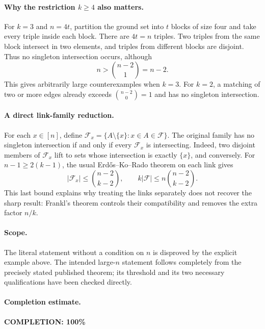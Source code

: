 \paragraph{Why the restriction \(k\geq4\) also matters.}
For \(k=3\) and \(n=4t\), partition the ground set into \(t\)
blocks of size four and take every triple inside each block.
There are \(4t=n\) triples. Two triples from the same block
intersect in two elements, and triples from different blocks
are disjoint. Thus no singleton intersection occurs, although
\[
 n>\binom{n-2}{1}=n-2.
\]
This gives arbitrarily large counterexamples when \(k=3\).
For \(k=2\), a matching of two or more edges already exceeds
\(\binom{n-2}{0}=1\) and has no singleton intersection.

\paragraph{A direct link-family reduction.}
For each \(x\in[n]\), define
\(\mathcal F_x=\{A\setminus\{x\}:x\in A\in\mathcal F\}\).
The original family has no singleton intersection if and
only if every \(\mathcal F_x\) is intersecting.
Indeed, two disjoint members of \(\mathcal F_x\) lift to sets
whose intersection is exactly \(\{x\}\), and conversely.
For \(n-1\geq2(k-1)\), the usual Erd\H{o}s--Ko--Rado theorem
on each link gives
\[
 |\mathcal F_x|\leq\binom{n-2}{k-2},\qquad
 k|\mathcal F|\leq n\binom{n-2}{k-2}.
\]
This last bound explains why treating the links separately
does not recover the sharp result: Frankl's theorem controls
their compatibility and removes the extra factor \(n/k\).

\paragraph{Scope.}
The literal statement without a condition on \(n\) is disproved
by the explicit example above. The intended large-\(n\)
statement follows completely from the precisely stated
published theorem; its threshold and its two necessary
qualifications have been checked directly.

\paragraph{Completion estimate.}
\textbf{COMPLETION: 100\%}
